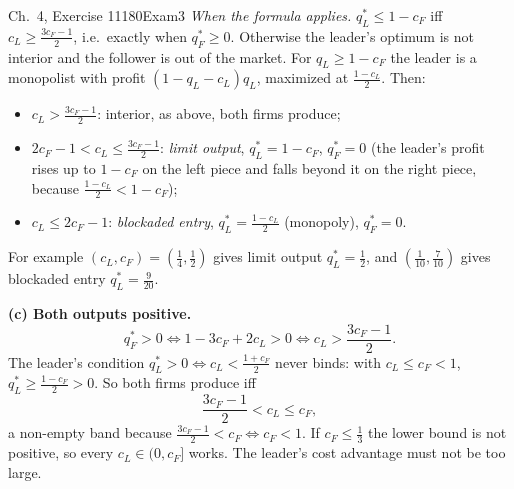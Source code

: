 \begin{exsol}{\MG{} Ch.~4, Exercise 11}{180}{Exam}{3}
\emph{When the formula applies.} $q_L^* \le 1 - c_F$ iff $c_L \ge \frac{3c_F-1}{2}$, i.e.\ exactly when
$q_F^* \ge 0$. Otherwise the leader's optimum is not interior and the follower is out of the market.
For $q_L \ge 1-c_F$ the leader is a monopolist with profit $(1 - q_L - c_L)q_L$, maximized at
$\frac{1-c_L}{2}$. Then:
\begin{itemize}
  \item $c_L > \frac{3c_F-1}{2}$: interior, as above, both firms produce;
  \item $2c_F - 1 < c_L \le \frac{3c_F-1}{2}$: \emph{limit output}, $q_L^* = 1 - c_F$, $q_F^* = 0$ (the
  leader's profit rises up to $1-c_F$ on the left piece and falls beyond it on the right piece,
  because $\frac{1-c_L}{2} < 1 - c_F$);
  \item $c_L \le 2c_F - 1$: \emph{blockaded entry}, $q_L^* = \frac{1-c_L}{2}$ (monopoly), $q_F^* = 0$.
\end{itemize}
For example $(c_L,c_F) = (\frac14,\frac12)$ gives limit output $q_L^* = \frac12$, and
$(\frac1{10},\frac7{10})$ gives blockaded entry $q_L^* = \frac9{20}$.

\textbf{(c) Both outputs positive.}
\[
  q_F^* > 0 \iff 1 - 3c_F + 2c_L > 0 \iff c_L > \frac{3c_F - 1}{2}.
\]
The leader's condition $q_L^* > 0 \iff c_L < \frac{1+c_F}{2}$ never binds: with $c_L \le c_F < 1$,
$q_L^* \ge \frac{1-c_F}{2} > 0$. So both firms produce iff
\[
  \frac{3c_F - 1}{2} < c_L \le c_F ,
\]
a non-empty band because $\frac{3c_F-1}{2} < c_F \iff c_F < 1$. If $c_F \le \frac13$ the lower bound
is not positive, so every $c_L \in (0, c_F]$ works. The leader's cost advantage must not be too large.


\end{exsol}

